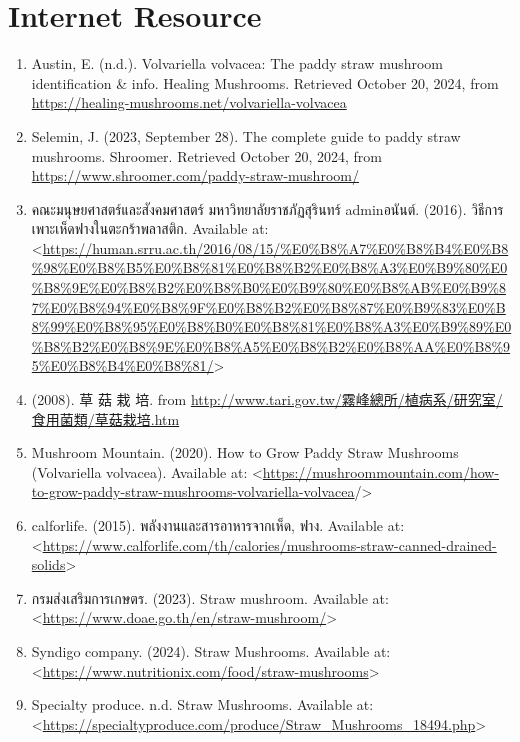 \section{Internet Resource}
\begin{enumerate}
  \item Austin, E. (n.d.). Volvariella volvacea: The paddy straw mushroom identification & info. Healing Mushrooms. Retrieved October 20, 2024, from \url{https://healing-mushrooms.net/volvariella-volvacea}
  \item Selemin, J. (2023, September 28). The complete guide to paddy straw mushrooms. Shroomer. Retrieved October 20, 2024, from \url{https://www.shroomer.com/paddy-straw-mushroom/}
  \item {\T คณะมนุษยศาสตร์และสังคมศาสตร์ มหาวิทยาลัยราชภัฏสุรินทร์ }admin{\T อนันต์.} (2016). {\T วิธีการเพาะเห็ดฟางในตะกร้าพลาสติก}. Available at: <\url{https://human.srru.ac.th/2016/08/15/%E0%B8%A7%E0%B8%B4%E0%B8%98%E0%B8%B5%E0%B8%81%E0%B8%B2%E0%B8%A3%E0%B9%80%E0%B8%9E%E0%B8%B2%E0%B8%B0%E0%B9%80%E0%B8%AB%E0%B9%87%E0%B8%94%E0%B8%9F%E0%B8%B2%E0%B8%87%E0%B9%83%E0%B8%99%E0%B8%95%E0%B8%B0%E0%B8%81%E0%B8%A3%E0%B9%89%E0%B8%B2%E0%B8%9E%E0%B8%A5%E0%B8%B2%E0%B8%AA%E0%B8%95%E0%B8%B4%E0%B8%81/}>
  \item (2008). {\fontsize{16}{24}\selectfont 草 菇 栽 培}. from \href{https://web.archive.org/web/20080506175441/http://www.tari.gov.tw/霧峰總所/植病系/研究室/食用菌類/草菇栽培.htm}{http://www.tari.gov.tw/{\fontsize{16}{24}\selectfont 霧峰總所}/{\fontsize{16}{24}\selectfont 植病系}/{\fontsize{16}{24}\selectfont 研究室}/{\fontsize{16}{24}\selectfont 食用菌類}/{\fontsize{16}{24}\selectfont 草菇栽培}.htm}
  \item Mushroom Mountain. (2020). How to Grow Paddy Straw Mushrooms (Volvariella volvacea). Available at: <\url{https://mushroommountain.com/how-to-grow-paddy-straw-mushrooms-volvariella-volvacea}/>
  \item calforlife. (2015). {\T พลังงานและสารอาหารจากเห็ด}, ฟาง. Available at: <\url{https://www.calforlife.com/th/calories/mushrooms-straw-canned-drained-solids}>
  \item {\T กรมส่งเสริมการเกษตร}. (2023). Straw mushroom. Available at: <\url{https://www.doae.go.th/en/straw-mushroom/}>
  \item Syndigo company. (2024). Straw Mushrooms. Available at: <\url{https://www.nutritionix.com/food/straw-mushrooms}>
  \item Specialty produce. n.d. Straw Mushrooms. Available at: <\url{https://specialtyproduce.com/produce/Straw\_Mushrooms\_18494.php}>

\end{enumerate}
